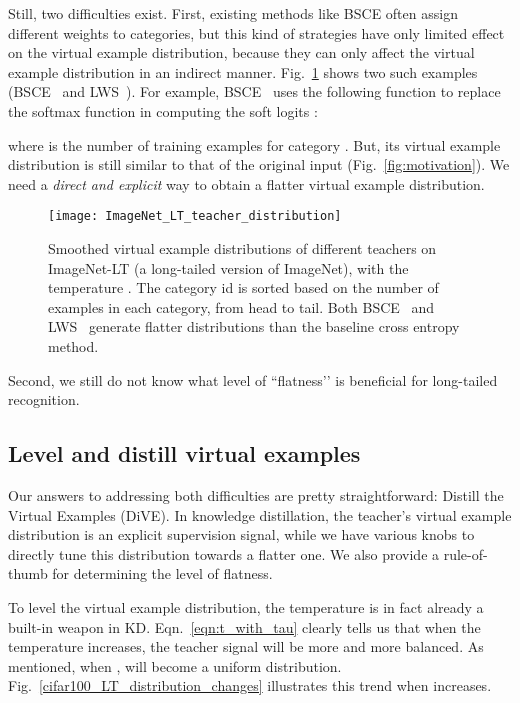 \documentclass[10pt,twocolumn,letterpaper]{article}
\begin{document}
Still, two difficulties exist. First, existing methods like BSCE often assign different weights to categories, but this kind of strategies have only limited effect on the virtual example distribution, because they can only affect the virtual example distribution in an indirect manner. Fig.~\ref{ImageNet_LT_teacher_distribution} shows two such examples (BSCE~\cite{ren2020BALMS} and LWS~\cite{kang2019decoupling}). For example, BSCE~\cite{ren2020BALMS} uses the following function to replace the softmax function in computing the soft logits :

where  is the number of training examples for category . But, its virtual example distribution is still similar to that of the original input (\cf Fig.~\ref{fig:motivation}). We need a \emph{direct and explicit} way to obtain a flatter virtual example distribution. 

\begin{figure}
   \centering
   \texttt{[image: ImageNet\_LT\_teacher\_distribution]}
   \caption{Smoothed virtual example distributions of different teachers on ImageNet-LT (a long-tailed version of ImageNet), with the temperature . The category id is sorted based on the number of examples in each category, from head to tail. Both BSCE~\cite{ren2020BALMS} and LWS~\cite{kang2019decoupling} generate flatter distributions than the baseline cross entropy method.}
   \label{ImageNet_LT_teacher_distribution}
\end{figure}

Second, we still do not know what level of ``flatness’’ is beneficial for long-tailed recognition.

\subsection{Level and distill virtual examples}\label{sec:gen_level_ve}

Our answers to addressing both difficulties are pretty straightforward: Distill the Virtual Examples (DiVE). In knowledge distillation, the teacher’s virtual example distribution  is an explicit supervision signal, while we have various knobs to directly tune this distribution towards a flatter one. We also provide a rule-of-thumb for determining the level of flatness.

To level the virtual example distribution, the temperature is in fact already a built-in weapon in KD.  Eqn.~\eqref{eqn:t_with_tau} clearly tells us that when the temperature  increases, the teacher signal  will be more and more balanced. As~\cite{yuan2020revisitingkd} mentioned, when ,  will become a uniform distribution. Fig.~\ref{cifar100_LT_distribution_changes} illustrates this trend when  increases.
\end{document}
